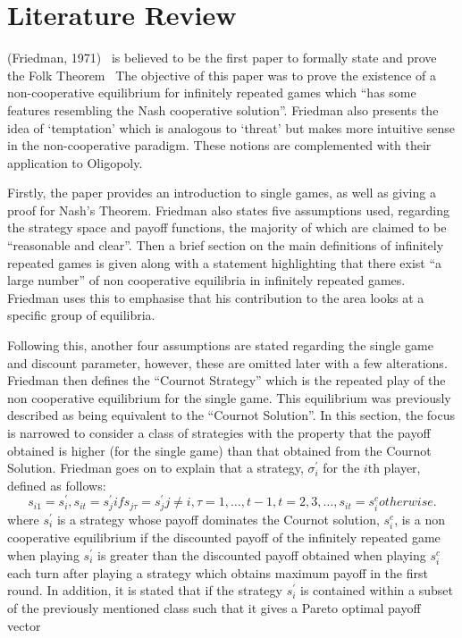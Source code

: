 \chapter{Literature Review}

(Friedman, 1971)~\cite{friedman1971non} is believed to be the first paper to
formally state and prove the Folk Theorem~%
The objective of this paper was to prove the existence of a non-cooperative
equilibrium for infinitely repeated games which ``has some features resembling
the Nash cooperative solution''. Friedman also presents the idea of `temptation'
which is analogous to `threat' but makes more intuitive sense in the
non-cooperative paradigm. These notions are complemented with their application
to Oligopoly.

Firstly, the paper provides an introduction to single games, as well as giving a
proof for Nash's Theorem. Friedman also states five assumptions used, regarding
the strategy space and payoff functions, the majority of which are claimed to be
``reasonable and clear''. Then a brief section on the main definitions of
infinitely repeated games is given along with a statement highlighting that
there exist ``a large number'' of non cooperative equilibria in infinitely
repeated games. Friedman uses this to emphasise that his contribution to the
area looks at a specific group of equilibria.

Following this, another four assumptions are stated regarding the single game
and discount parameter, however, these are omitted later with a few alterations.
Friedman then defines the ``Cournot Strategy'' which is the repeated play of the
non cooperative equilibrium for the single game. This equilibrium was previously
described as being equivalent to the ``Cournot Solution''. In this section, the
focus is narrowed to consider a class of strategies with the property that the
payoff obtained is higher (for the single game) than that obtained from the
Cournot Solution. Friedman goes on to explain that a strategy,
\(\sigma_{i}^{'}\) for the \(i\)th player, defined as
follows:
\begin{equation}
    s_{i1} = s_{i}^{'},
    s_{it} = s_{j}^{'} if s_{j\tau} = s_{j}^{'} j \ne i, \tau = 1, \ldots, t-1, t=2, 3, \ldots,
    s_{it} = s_{i}^{c} otherwise.
\end{equation}
where \(s_{i}^{'}\) is a strategy whose payoff dominates the Cournot solution,
\(s_{i}^{c}\), is a non cooperative equilibrium if the discounted payoff of the
infinitely repeated game when playing  \(s_{i}^{'}\) is greater than the
discounted payoff obtained when playing \(s_{i}^{c}\) each turn after playing a
strategy which obtains maximum payoff in the first round. In addition, it is
stated that if the strategy \(s_{i}^{'}\) is contained within a subset of the
previously mentioned class such that it gives a Pareto optimal payoff vector 